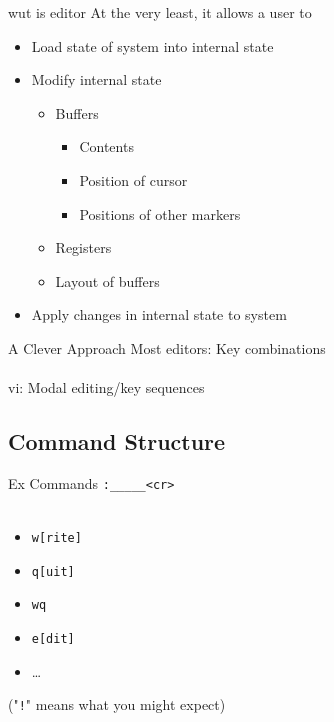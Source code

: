 \documentclass{beamer}
\begin{document}
            \begin{frame}{wut is editor}
                \pause
                At the very least, it allows a user to
                \begin{itemize}
                    \pause
                    \item Load state of system into internal state
                    \pause
                    \item Modify internal state
                    \begin{itemize}
                        \pause
                        \item Buffers
                        \pause
                        \begin{itemize}
                            \item Contents
                            \item Position of cursor
                            \item Positions of other markers
                        \end{itemize}
                        \pause
                        \item Registers
                        \pause
                        \item Layout of buffers
                    \end{itemize}
                    \pause
                    \item Apply changes in internal state to system
                \end{itemize}
            \end{frame}

            \begin{frame}{A Clever Approach}
                Most editors: Key combinations \\~\\
                \pause
                vi: Modal editing/key sequences
            \end{frame}

        \subsection{Command Structure}

            \begin{frame}{Ex Commands}
                \texttt{:\_\_\_\_\_<cr>} \\~\\
                \begin{itemize}
                    \item \texttt{w[rite]}
                    \item \texttt{q[uit]}
                    \item \texttt{wq}
                    \item \texttt{e[dit]}
                    \item \dots
                \end{itemize}
                ("\texttt{!}" means what you might expect)
            \end{frame}
\end{document}
